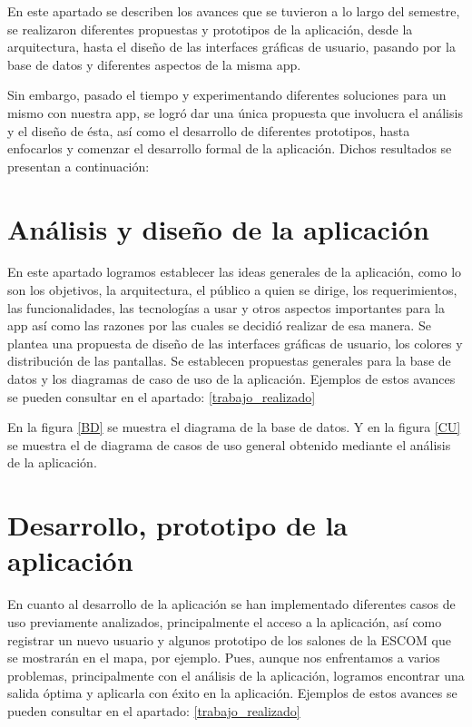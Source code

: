 \noindent
En este apartado se describen los avances que se tuvieron a lo largo del semestre, se realizaron diferentes propuestas y prototipos de la aplicación, desde la arquitectura, hasta el diseño de las interfaces gráficas de usuario, pasando por la base de datos y diferentes aspectos de la misma app.

\noindent
Sin embargo, pasado el tiempo y experimentando diferentes soluciones para un mismo con nuestra app, se logró dar una única propuesta que involucra el análisis y el diseño de ésta, así como el desarrollo de diferentes prototipos, hasta enfocarlos y comenzar el desarrollo formal de la aplicación. Dichos resultados se presentan a continuación:

\section{Análisis y diseño de la aplicación}
\noindent
En este apartado logramos establecer las ideas generales de la aplicación, como lo son los objetivos, la arquitectura, el público a quien se dirige, los requerimientos, las funcionalidades, las tecnologías a usar y otros aspectos importantes para la app así como las razones por las cuales se decidió realizar de esa manera. Se plantea una propuesta de diseño de las interfaces gráficas de usuario, los colores y distribución de las pantallas. Se establecen propuestas generales para la base de datos y los diagramas de caso de uso de la aplicación. Ejemplos de estos avances se pueden consultar en el apartado: \ref{trabajo_realizado}

\noindent
En la figura \ref{BD} se muestra el diagrama de la base de datos. Y en la figura \ref{CU} se muestra el de diagrama de casos de uso general obtenido mediante el análisis de la aplicación.


\newpage
\section{Desarrollo, prototipo de la aplicación}
\noindent
En cuanto al desarrollo de la aplicación se han implementado diferentes casos de uso previamente analizados, principalmente el acceso a la aplicación, así como registrar un nuevo usuario y algunos prototipo de los salones de la ESCOM que se mostrarán en el mapa, por ejemplo. Pues, aunque nos enfrentamos a varios problemas, principalmente con el análisis de la aplicación, logramos encontrar una salida óptima y aplicarla con éxito en la aplicación. Ejemplos de estos avances se pueden consultar en el apartado: \ref{trabajo_realizado}
